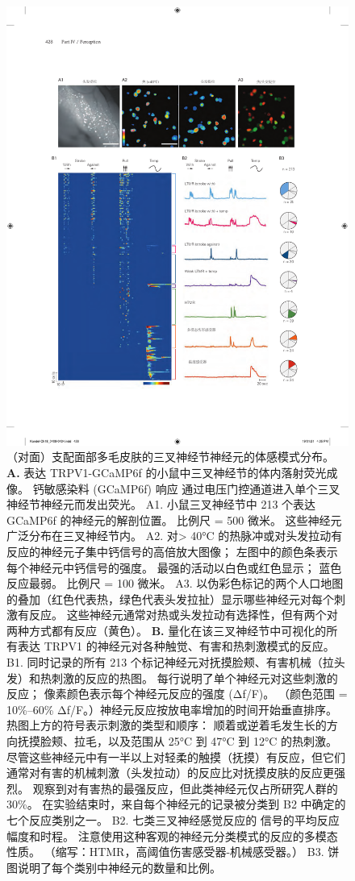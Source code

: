 \begin{figure}[htbp]
	\centering
	\includegraphics[width=0.8\linewidth]{chap18/fig_18_12}
	\caption{（对面）支配面部多毛皮肤的三叉神经节神经元的体感模式分布\cite{ghitani2017specialized}。
		\textbf{A.} 表达 TRPV1-GCaMP6f 的小鼠中三叉神经节的体内落射荧光成像。 
		钙敏感染料 (GCaMP6f) 响应  通过电压门控通道进入单个三叉神经节神经元而发出荧光。 
		A1. 小鼠三叉神经节中 213 个表达 GCaMP6f 的神经元的解剖位置。
		比例尺 = 500 微米。 这些神经元广泛分布在三叉神经节内。 
		A2. 对> 40°C 的热脉冲或对头发拉动有反应的神经元子集中钙信号的高倍放大图像；
		左图中的颜色条表示每个神经元中钙信号的强度。
		最强的活动以白色或红色显示；
		蓝色反应最弱。
		比例尺 = 100 微米。 
		A3. 以伪彩色标记的两个人口地图的叠加（红色代表热，绿色代表头发拉扯）显示哪些神经元对每个刺激有反应。
		这些神经元通常对热或头发拉动有选择性，但有两个对两种方式都有反应（黄色）。 
		\textbf{B.} 量化在该三叉神经节中可视化的所有表达 TRPV1 的神经元对各种触觉、有害和热刺激模式的反应。 
		B1. 同时记录的所有 213 个标记神经元对抚摸脸颊、有害机械（拉头发）和热刺激的反应的热图。
		每行说明了单个神经元对这些刺激的反应；
		像素颜色表示每个神经元反应的强度 (Δf/F)。
		（颜色范围 = 10\%–60\% Δf/F。）神经元反应按放电率增加的时间开始垂直排序。
		热图上方的符号表示刺激的类型和顺序：
		顺着或逆着毛发生长的方向抚摸脸颊、拉毛，以及范围从 25°C 到 47°C 到 12°C 的热刺激。 
		尽管这些神经元中有一半以上对轻柔的触摸（抚摸）有反应，但它们通常对有害的机械刺激（头发拉动）的反应比对抚摸皮肤的反应更强烈。 
		观察到对有害热的最强反应，但此类神经元仅占所研究人群的 30\%。 在实验结束时，来自每个神经元的记录被分类到 B2 中确定的七个反应类别之一。 
		B2. 七类三叉神经感觉反应的  信号的平均反应幅度和时程。 注意使用这种客观的神经元分类模式的反应的多模态性质。
		（缩写：HTMR，高阈值伤害感受器-机械感受器。） 
		B3. 饼图说明了每个类别中神经元的数量和比例。}
	\label{fig:18_12}
\end{figure}


